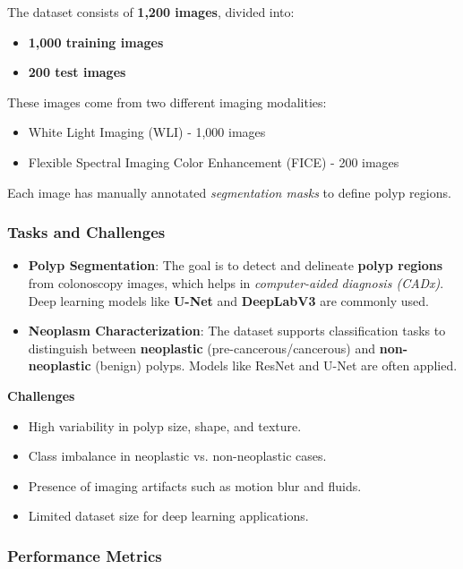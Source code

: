 \documentclass[conference]{IEEEtran}
\begin{document}
The dataset consists of \textbf{1,200 images}, divided into:
\begin{itemize}
    \item \textbf{1,000 training images}
    \item \textbf{200 test images}
\end{itemize}
These images come from two different imaging modalities:
\begin{itemize}
    \item White Light Imaging (WLI) - 1,000 images
    \item Flexible Spectral Imaging Color Enhancement (FICE) - 200 images
\end{itemize}
Each image has manually annotated \textit{segmentation masks} to define polyp regions.

\subsubsection{Tasks and Challenges}
\begin{itemize}

    \item{\textbf{Polyp Segmentation}:} The goal is to detect and delineate \textbf{polyp regions} from colonoscopy images, which helps in \textit{computer-aided diagnosis (CADx)}. Deep learning models like \textbf{U-Net} and \textbf{DeepLabV3} are commonly used.

    \item{\textbf{Neoplasm Characterization}:} The dataset supports classification tasks to distinguish between \textbf{neoplastic} (pre-cancerous/cancerous) and \textbf{non-neoplastic} (benign) polyps. Models like ResNet and U-Net are often applied.

\end{itemize}

\textbf{Challenges}
\begin{itemize}
    \item High variability in polyp size, shape, and texture.
    \item Class imbalance in neoplastic vs. non-neoplastic cases.
    \item Presence of imaging artifacts such as motion blur and fluids.
    \item Limited dataset size for deep learning applications.
\end{itemize}

\subsubsection{Performance Metrics}
\end{document}

